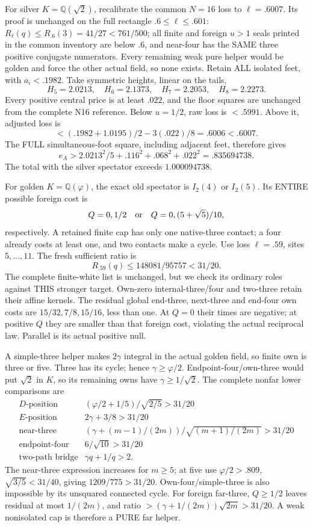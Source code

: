 For silver \(K=\mathbb Q(\sqrt2)\),
recalibrate the common \(N=16\) loss to
\(\ell=.6007\).
Its proof is unchanged on the full rectangle
\(.6\le\ell\le.601\):
\(R_\ell(q)\le R_{.6}(3)=41/27<761/500\);
all finite and foreign \(u>1\) seals
printed in the common inventory are below
\(.6\), and near-four has the SAME three
positive conjugate numerators.
Every remaining weak pure helper would
be golden and force the other actual field,
so none exists.
Retain ALL isolated feet, with
\(a_i<.1982\).
Take symmetric heights, linear on the tails,
\[
             H_5=2.0213,\quad H_6=2.1373,\quad
             H_7=2.2053,\quad H_8=2.2273 .
\]
Every positive central price is at least
\(.022\), and the floor squares are unchanged
from the complete N16 reference.
Below \(u=1/2\), raw loss is \(<.5991\).
Above it, adjusted loss is
\[
             <(.1982+1.0195)/2-3(.022)/8
                          =.6006<.6007 .
\]
The FULL simultaneous-foot square, including
adjacent feet, therefore gives
\[
                 e_A>2.0213^2/5+.116^2+.068^2+.022^2
                       =.835694738 .
\]
The total with the silver spectator
exceeds \(1.000094738\).

For golden \(K=\mathbb Q(\varphi)\),
the exact old spectator is \(I_2(4)\)
or \(I_2(5)\).
Its ENTIRE possible foreign cost is
\[
 Q=0,1/2\quad\hbox{or}\quad Q=0,(5+\sqrt5)/10,
\]
respectively.
A retained finite cap has only one
native-three contact; a four already costs
at least one, and two contacts make a cycle.
Use loss \(\ell=.59\), sites \(5,\ldots,11\).
The fresh sufficient ratio is
\[
                  R_{.59}(q)\le148081/95757<31/20 .
\]
The complete finite-white list is unchanged,
but we check its ordinary roles against
THIS stronger target.
Own-zero internal-three/four and two-three
retain their affine kernels.
The residual global end-three, next-three
and end-four own costs are \(15/32,7/8,15/16\),
less than one.
At \(Q=0\) their times are negative;
at positive \(Q\) they are smaller than
that foreign cost, violating the actual
reciprocal law.
Parallel is its actual positive null.

A simple-three helper makes \(2\gamma\)
integral in the actual golden field,
so finite own is three or five.
Three has its cycle; hence
\(\gamma\ge\varphi/2\).
Endpoint-four/own-three would put
\(\sqrt2\) in \(K\), so its remaining
owns have \(\gamma\ge1/\sqrt2\).
The complete nonfar lower comparisons are
\[
 \begin{array}{c|c}
 D\text{-position}&(\varphi/2+1/5)/\sqrt{2/5}>31/20\\
 E\text{-position}&2\gamma+3/8>31/20\\
 \text{near-three}&
 (\gamma+(m-1)/(2m))/\sqrt{(m+1)/(2m)}>31/20\\
 \text{endpoint-four}&6/\sqrt{10}>31/20\\
 \text{two-path bridge}&\gamma q+1/q>2 .
 \end{array}
\]
The near-three expression increases for
\(m\ge5\); at five use \(\varphi/2>.809\),
\(\sqrt{3/5}<31/40\), giving
\(1209/775>31/20\).
Own-four/simple-three is also impossible
by its unsquared connected cycle.
For foreign far-three, \(Q\ge1/2\)
leaves residual at most \(1/(2m)\),
and ratio \(>(\gamma+1/(2m))\sqrt{2m}>31/20\).
A weak nonisolated cap is therefore
a PURE far helper.

